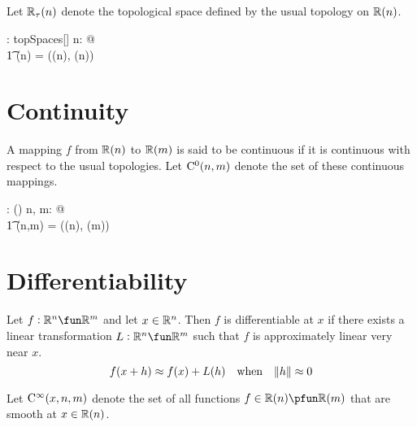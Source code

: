 \documentclass[11pt, oneside]{article}
\begin{document}
\subsection{}

Let $\mathbb{R}_\tau(n)$ denote the topological space defined by the usual topology on $\mathbb{R}(n)$.

\begin{axdef}
	\Rtaun: \nat \fun topSpaces[\Rinf]
\where
	\forall n: \nat @ \\
	\t1	\Rtaun(n) = (\Rtuples(n), \tauRn(n))
\end{axdef}

\section{Continuity}

A mapping $f$ from $\mathbb{R}(n)$ to $\mathbb{R}(m)$ is said to be continuous if it is continuous with respect to the usual topologies.
Let $\operatorname{C^0}(n,m)$ denote the set of these continuous mappings.

\begin{axdef}
	\CzeroRnm: \nat \cross \nat \fun \power(\Rinf \pfun \Rinf)
\where
	\forall n, m: \nat @ \\
	\t1	\CzeroRnm(n,m) = \CzeroTT(\Rtaun(n), \Rtaun(m)) 
\end{axdef}

\section{Differentiability}

Let $f: \R^n \fun \R^m$ and let $x \in \mathbb{R}^n$.
Then $f$ is differentiable at $x$ if there exists a linear transformation $L: \R^n \fun \R^m$
such that $f$ is approximately linear very near $x$.
$$
f(x + h) \approx f(x) + L(h) \quad \text{when} \quad \norm{h} \approx 0
$$ 

Let $\operatorname{C^\infty}(x,n,m)$ denote the set of all functions $f \in \Rtuples(n) \pfun \Rtuples(m)$ that are smooth at $x \in \mathbb{R}(n)$.

\printbibliography
\end{document}
